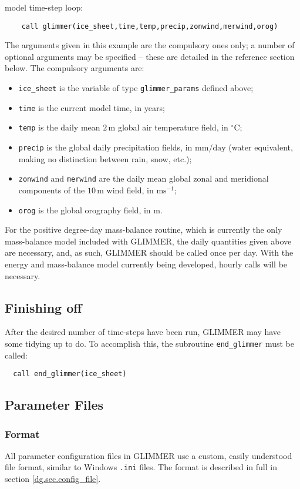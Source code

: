 model time-step loop:
%
\begin{verbatim}
    call glimmer(ice_sheet,time,temp,precip,zonwind,merwind,orog)
\end{verbatim} 
%
The arguments given in this example are the compulsory ones only; a number of
optional arguments may be specified -- these are detailed in the reference
section below. The compulsory arguments are:
%
\begin{itemize}
\item \texttt{ice\_sheet} is the variable of type \texttt{glimmer\_params}
 defined above;
\item \texttt{time} is the current model time, in years;
\item \texttt{temp} is the daily mean $2\,\mathrm{m}$ global air temperature field, in
  $^{\circ}\mathrm{C}$;
\item \texttt{precip} is the global daily precipitation fields,
  in $\mathrm{mm}/\mathrm{day}$ (water equivalent, making no distinction
  between rain, snow, etc.);
\item \texttt{zonwind} and \texttt{merwind} are the daily mean global zonal and
  meridional components of the $10\,\mathrm{m}$ wind field, in
  $\mathrm{ms}^{-1}$;
\item \texttt{orog} is the global orography field, in $\mathrm{m}$.
\end{itemize}
%
For the positive degree-day mass-balance routine, which is currently the only
mass-balance model included with GLIMMER, the daily quantities given above are
necessary, and, as such, GLIMMER should be called once per day. With the
energy and mass-balance model currently being developed, hourly calls will be
necessary. 
%
\subsection{Finishing off}
%
After the desired number of time-steps have been run, GLIMMER may have some
tidying up to do. To accomplish this, the subroutine \texttt{end\_glimmer}
must be called:
%
\begin{verbatim}
  call end_glimmer(ice_sheet)
\end{verbatim}
%

\subsection{Parameter Files}
\subsubsection{Format}
%
All parameter configuration files in GLIMMER use a custom, easily
understood file format, similar to Windows \texttt{.ini} files. The format is
described in full in section \ref{dg.sec.config_file}. 


